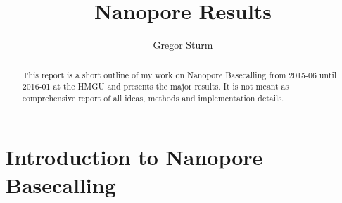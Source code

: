 \documentclass[]{scrartcl}
\title{Nanopore Results %
}
\author{Gregor Sturm}
\begin{document}
\maketitle

\begin{abstract}
This report is a short outline of my work on Nanopore Basecalling from 2015-06 until 2016-01 at the HMGU and presents the major results. It is not meant as comprehensive report of all ideas, methods and implementation details. 
\end{abstract}

\section{Introduction to Nanopore Basecalling}
%
%
%
\end{document}
